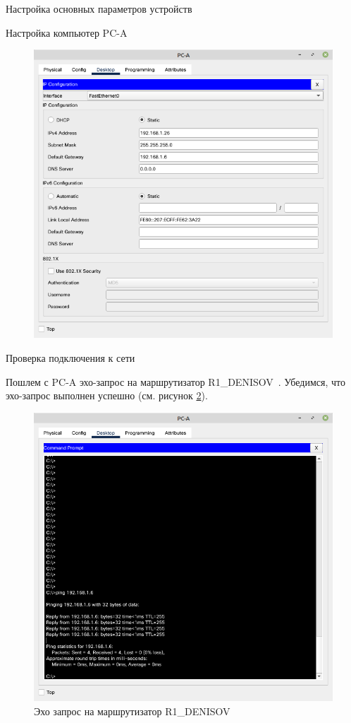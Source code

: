 \documentclass[a4paper,14pt]{extarticle}
\newcommand{\router}{R1\_DENISOV~}
\begin{document}
\begin{mypart}{Настройка основных параметров устройств}
\begin{step}{Настройка компьютер PC-A}
	\begin{figure}[h!]
		\centering
		\includegraphics[width=0.6\linewidth]{images/pr8-pc-a}
		\caption{}
		\label{fig:pr8-pc-a}
	\end{figure}
	
\end{step}

\begin{step}{Проверка подключения к сети}
	
	Пошлем с PC-A эхо-запрос на маршрутизатор \router. Убедимся, что эхо-запрос выполнен
	успешно (см. рисунок \ref{fig:pr8-ping-router}).
	
	
	\begin{figure}[h!]
		\centering
		\includegraphics[width=0.6\linewidth]{images/pr8-ping-router}
		\caption{Эхо запрос на маршрутизатор \router}
		\label{fig:pr8-ping-router}
	\end{figure}
	
\end{step}

\end{mypart}
\end{document}
